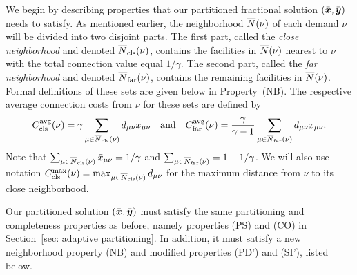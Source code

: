 We begin by describing properties that our partitioned fractional
solution $(\bar{\boldsymbol{x}},\bar{\boldsymbol{y}})$ needs to satisfy. As mentioned earlier, the neighborhood
${\overline{N}}(\nu)$ of each demand $\nu$ will be divided into two disjoint
parts.  The first part, called the \emph{close neighborhood} and denoted
${\overline{N}}_{\text{cls}}(\nu)$, contains the facilities in ${\overline{N}}(\nu)$ nearest to
$\nu$ with the total connection value equal $1/\gamma$. The second
part, called the \emph{far neighborhood} and denoted ${\overline{N}}_{\text{far}}(\nu)$, contains
the remaining facilities in ${\overline{N}}(\nu)$. Formal definitions of
these sets are given below in Property~(NB).  The respective average
connection costs from $\nu$ for these sets are defined by
%
\begin{equation*}
C_{\text{cls}}^{{\mbox{\scriptsize\rm avg}}}(\nu)=\gamma\sum_{\mu\in{\overline{N}}_{\text{cls}}(\nu)}
			d_{\mu\nu}{\bar x}_{\mu\nu} \quad\text{and}\quad
C_{\text{far}}^{{\mbox{\scriptsize\rm avg}}}(\nu)=\frac{\gamma}{\gamma-1}\sum_{\mu\in{\overline{N}}_{\text{far}}(\nu)}
d_{\mu\nu}{\bar x}_{\mu\nu}. 
\end{equation*}
%
Note that $\sum_{\mu\in{\overline{N}}_{\text{cls}}(\nu)} {\bar x}_{\mu\nu} = 1/\gamma$ and
$\sum_{\mu\in{\overline{N}}_{\text{far}}(\nu)} = 1-1/\gamma$.  We will also use
notation $C_{\text{cls}}^{\max}(\nu)=\max_{\mu\in{\overline{N}}_{\text{cls}}(\nu)} d_{\mu\nu}$ for
the maximum distance from $\nu$ to its close neighborhood.

Our partitioned solution $(\bar{\boldsymbol{x}},\bar{\boldsymbol{y}})$ must satisfy the same
partitioning and completeness properties as before, namely properties
(PS) and (CO) in Section~\ref{sec: adaptive partitioning}.  In
addition, it must satisfy a new neighborhood property (NB) and modified
properties (PD') and (SI'), listed below.

